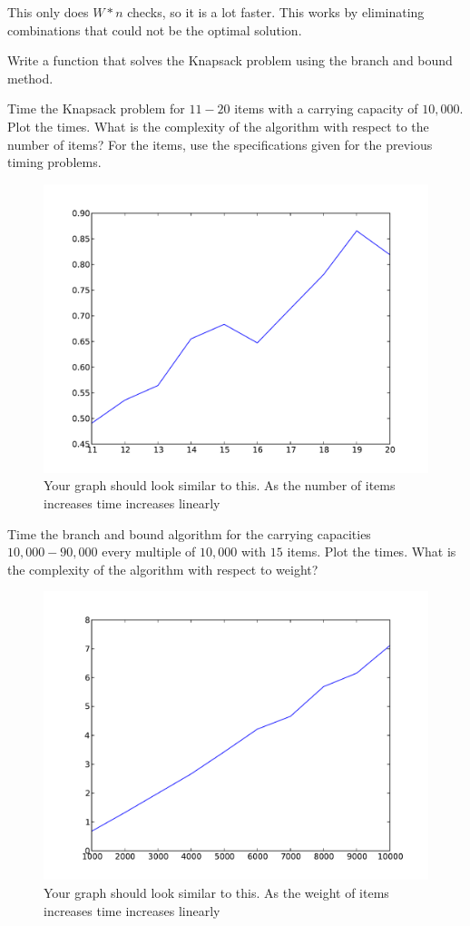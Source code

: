 This only does $W*n$ checks, so it is a lot faster.
This works by eliminating combinations that could not be the optimal solution.

\begin{problem}
Write a function that solves the Knapsack problem using the branch and bound method.
\end{problem}

\begin{problem}
Time the Knapsack problem for $11-20$ items with a carrying capacity of $10,000$.
Plot the times.
What is the complexity of the algorithm with respect to the number of items?
For the items, use the specifications given for the previous timing problems.
\end{problem}

\begin{figure}[H]
\includegraphics[scale = .5]{dynamicTime.pdf}
\caption{
Your graph should look similar to this.
As the number of items increases time increases linearly}
\end{figure}

\begin{problem}
Time the branch and bound algorithm for the carrying capacities $10,000-90,000$ every multiple of $10,000$ with $15$ items.
Plot the times.
What is the complexity of the algorithm with respect to weight?
\end{problem}

\begin{figure}[H]
\includegraphics[scale = .5]{dynamicWeight.pdf}
\caption{
Your graph should look similar to this.
As the weight of items increases time increases linearly}
\end{figure}
